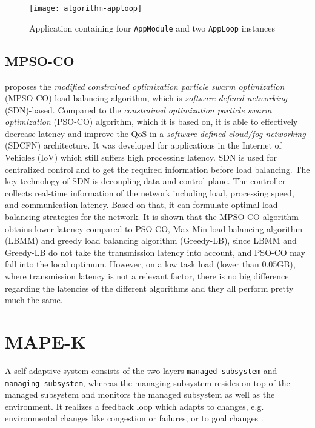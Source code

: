\begin{figure}
    \centering
    \texttt{[image: algorithm-apploop]}
    \caption{Application containing four \texttt{AppModule} and two \texttt{AppLoop} instances}
    \label{fig:apploop}
\end{figure}

\subsection{MPSO-CO}

\cite{novel-load-balancing} proposes the \textit{modified constrained optimization particle swarm optimization} (MPSO-CO) load balancing algorithm, which is \textit{software defined networking} (SDN)-based. Compared to the \textit{constrained optimization particle swarm optimization} (PSO-CO) algorithm, which it is based on, it is able to effectively decrease latency and improve the QoS in a \textit{software defined cloud/fog networking} (SDCFN) architecture. It was developed for applications in the Internet of Vehicles (IoV) which still suffers high processing latency. SDN is used for centralized control and to get the required information before load balancing. The key technology of SDN is decoupling data and control plane. The controller collects real-time information of the network including load, processing speed, and communication latency. Based on that, it can formulate optimal load balancing strategies for the network. It is shown that the MPSO-CO algorithm obtains lower latency compared to PSO-CO, Max-Min load balancing algorithm (LBMM) and greedy load balancing algorithm (Greedy-LB), since LBMM and Greedy-LB do not take the transmission latency into account, and PSO-CO may fall into the local optimum. However, on a low task load (lower than 0.05GB), where transmission latency is not a relevant factor, there is no big difference regarding the latencies of the different algorithms and they all perform pretty much the same.

\section{MAPE-K}
A self-adaptive system consists of the two layers \texttt{managed subsystem} and \texttt{managing subsystem}, whereas the managing subsystem resides on top of the managed subsystem and monitors the managed subsystem as well as the environment. It realizes a feedback loop which adapts to changes, e.g. environmental changes like congestion or failures, or to goal changes \cite{mape-k}.\\

